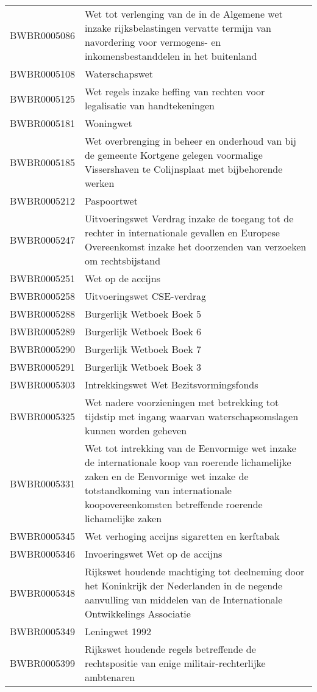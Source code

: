 \begin{longtable}{lp{}}
BWBR0005086 & Wet tot verlenging van de in de Algemene wet inzake rijksbelastingen vervatte termijn van navordering voor vermogens- en inkomensbestanddelen in het buitenland \\
BWBR0005108 & Waterschapswet \\
BWBR0005125 & Wet regels inzake heffing van rechten voor legalisatie van handtekeningen \\
BWBR0005181 & Woningwet \\
BWBR0005185 & Wet overbrenging in beheer en onderhoud van bij de gemeente Kortgene gelegen voormalige Vissershaven te Colijnsplaat met bijbehorende werken \\
BWBR0005212 & Paspoortwet \\
BWBR0005247 & Uitvoeringswet Verdrag inzake de toegang tot de rechter in internationale gevallen en Europese Overeenkomst inzake het doorzenden van verzoeken om rechtsbijstand \\
BWBR0005251 & Wet op de accijns \\
BWBR0005258 & Uitvoeringswet CSE-verdrag \\
BWBR0005288 & Burgerlijk Wetboek Boek 5 \\
BWBR0005289 & Burgerlijk Wetboek Boek 6 \\
BWBR0005290 & Burgerlijk Wetboek Boek 7 \\
BWBR0005291 & Burgerlijk Wetboek Boek 3 \\
BWBR0005303 & Intrekkingswet Wet Bezitsvormingsfonds \\
BWBR0005325 & Wet nadere voorzieningen met betrekking tot tijdstip met ingang waarvan waterschapsomslagen kunnen worden geheven \\
BWBR0005331 & Wet tot intrekking van de Eenvormige wet inzake de internationale koop van roerende lichamelijke zaken en de Eenvormige wet inzake de totstandkoming van internationale koopovereenkomsten betreffende roerende lichamelijke zaken \\
BWBR0005345 & Wet verhoging accijns sigaretten en kerftabak \\
BWBR0005346 & Invoeringswet Wet op de accijns \\
BWBR0005348 & Rijkswet houdende machtiging tot deelneming door het Koninkrijk der Nederlanden in de negende aanvulling van middelen van de Internationale Ontwikkelings Associatie \\
BWBR0005349 & Leningwet 1992 \\
BWBR0005399 & Rijkswet houdende regels betreffende de rechtspositie van enige militair-rechterlijke ambtenaren \\

\end{longtable}
